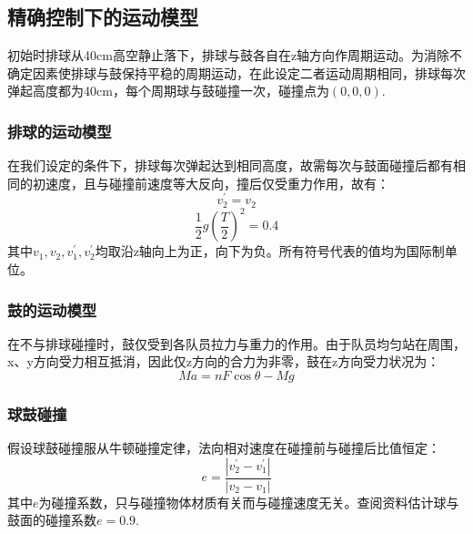 \documentclass{cumcmthesis}
\begin{document}
\subsection{精确控制下的运动模型}
初始时排球从40cm高空静止落下，排球与鼓各自在z轴方向作周期运动。为消除不确定因素使排球与鼓保持平稳的周期运动，在此设定二者运动周期相同，排球每次弹起高度都为40cm，每个周期球与鼓碰撞一次，碰撞点为$(0,0,0)$.
\subsubsection{排球的运动模型}
在我们设定的条件下，排球每次弹起达到相同高度，故需每次与鼓面碰撞后都有相同的初速度，且与碰撞前速度等大反向，撞后仅受重力作用，故有：$$v_2^{'}=v_2$$ $$\frac{1}{2}g(\frac{T}{2})^2=0.4$$
其中$v_1, v_2, v_1^{'}, v_2^{'}$均取沿z轴向上为正，向下为负。所有符号代表的值均为国际制单位。
\subsubsection{鼓的运动模型}
在不与排球碰撞时，鼓仅受到各队员拉力与重力的作用。由于队员均匀站在周围，x、y方向受力相互抵消，因此仅z方向的合力为非零，鼓在z方向受力状况为：
$$Ma=nF\cos\theta-Mg$$
\subsubsection{球鼓碰撞}
假设球鼓碰撞服从牛顿碰撞定律，法向相对速度在碰撞前与碰撞后比值恒定：
$$e=\frac{|v_2^{'}-v_1^{'}|}{|v_2-v_1|}$$
其中$e$为碰撞系数，只与碰撞物体材质有关而与碰撞速度无关。查阅资料估计球与鼓面的碰撞系数$e=0.9$.
\end{document}
